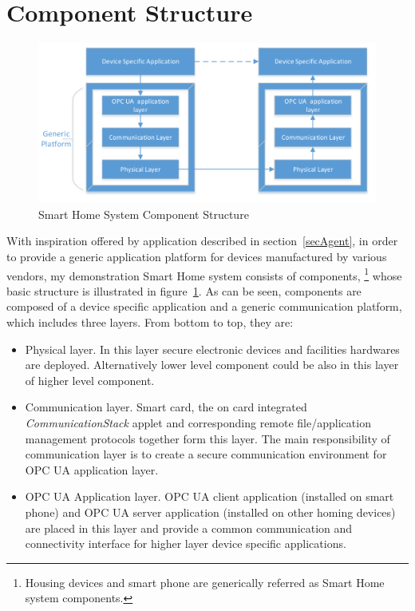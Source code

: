 \section {Component Structure}
 \begin{figure}[!htb]
	\centering
	\includegraphics[width=1.1\textwidth]{component}
		\caption{Smart Home System Component Structure}
	\label{fig:SmartHomeComponent}
\end{figure}
With inspiration offered by application described in section~\ref{secAgent}, in order to provide a generic application platform for devices manufactured by various vendors, my demonstration Smart Home system consists of components, \footnote{Housing devices and smart phone are generically referred as Smart Home system components.} whose basic structure is illustrated in figure~\ref{fig:SmartHomeComponent}.  As can be seen, components are composed of a device specific application and a generic communication platform, which includes three layers. From bottom to top, they are:

\begin{itemize}
\item Physical layer. In this layer secure electronic devices and facilities hardwares are deployed. Alternatively lower level component could be also in this layer of higher level component.
\item Communication layer. Smart card, the on card integrated \emph{CommunicationStack} applet and corresponding remote file/application management protocols together form this layer. The main responsibility of communication layer is to create a secure communication environment for OPC UA application layer.
\item OPC UA Application layer. OPC UA client application (installed on smart phone) and OPC UA server application (installed on other homing devices) are placed in this layer and provide a common communication and connectivity interface for higher layer device specific applications. 
\end{itemize}


